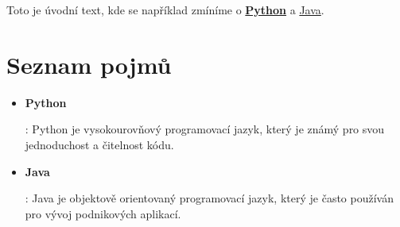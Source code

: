 \documentclass{article}
\begin{document}
    Toto je úvodní text, kde se například zmíníme o \hyperlink{def:python}{\textbf{Python}} a \hyperlink{def:java}{Java}.

    \section*{Seznam pojmů}

    \begin{itemize}
        \item \hypertarget{def:python}{\textbf{Python}}: Python je vysokourovňový programovací jazyk, který je známý pro svou jednoduchost a čitelnost kódu.
        \item \hypertarget{def:java}{\textbf{Java}}: Java je objektově orientovaný programovací jazyk, který je často používán pro vývoj podnikových aplikací.
    \end{itemize}
\end{document}
